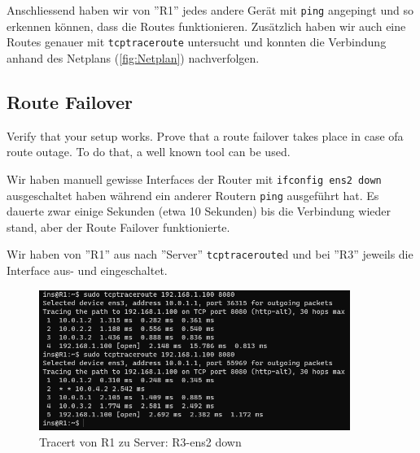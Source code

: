 \documentclass[11pt,titlepage]{article}
\newenvironment{shadedquotation}
 {\begin{shaded*}
  \quoting[leftmargin=0pt, vskip=0pt]
 }
 {\endquoting
 \end{shaded*}
}
\begin{document}
\medskip

Anschliessend haben wir von ''R1'' jedes andere Gerät mit \lstinline!ping! angepingt und so erkennen können, dass die Routes funktionieren. Zusätzlich haben wir auch eine Routes genauer mit \lstinline!tcptraceroute! untersucht und konnten die Verbindung anhand des Netplans (\autoref{fig:Netplan}) nachverfolgen.  

\subsection{Route Failover}
\label{subsec:RouteFailover}
\begin{shadedquotation}
  Verify that your setup works. Prove that a route failover takes place in case ofa route outage. To do that, a well known tool can be used.
\end{shadedquotation}

Wir haben manuell gewisse Interfaces der Router mit \lstinline!ifconfig ens2 down! ausgeschaltet haben während ein anderer Routern \lstinline!ping! ausgeführt hat. Es dauerte zwar einige Sekunden (etwa 10 Sekunden) bis die Verbindung wieder stand, aber der Route Failover funktionierte.

\medskip

Wir haben von ''R1'' aus nach ''Server'' \lstinline!tcptraceroute!d und bei ''R3'' jeweils die Interface aus- und eingeschaltet.

\begin{figure}[H]
  \begin{center}
    \includegraphics[width=0.90\textwidth]{images/tcptracert_R3-ens2-down.png}
    \caption{Tracert von R1 zu Server: R3-ens2 down}
    \label{fig:RouteFailoverDown}
  \end{center}
\end{figure}
\end{document}
